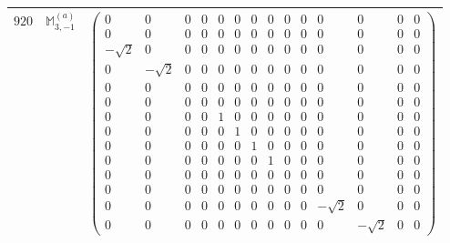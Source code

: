 \documentclass[fleqn,8pt,landscape]{jsarticle}
\begin{document}
\begin{center}
\begin{longtable}{ccc}
$ 920 $ & $ \mathbb{M}_{3,-1}^{(a)} $ & $ \begin{pmatrix} 0 & 0 & 0 & 0 & 0 & 0 & 0 & 0 & 0 & 0 & 0 & 0 & 0 & 0 \\ 0 & 0 & 0 & 0 & 0 & 0 & 0 & 0 & 0 & 0 & 0 & 0 & 0 & 0 \\ - \sqrt{2} & 0 & 0 & 0 & 0 & 0 & 0 & 0 & 0 & 0 & 0 & 0 & 0 & 0 \\ 0 & - \sqrt{2} & 0 & 0 & 0 & 0 & 0 & 0 & 0 & 0 & 0 & 0 & 0 & 0 \\ 0 & 0 & 0 & 0 & 0 & 0 & 0 & 0 & 0 & 0 & 0 & 0 & 0 & 0 \\ 0 & 0 & 0 & 0 & 0 & 0 & 0 & 0 & 0 & 0 & 0 & 0 & 0 & 0 \\ 0 & 0 & 0 & 0 & 1 & 0 & 0 & 0 & 0 & 0 & 0 & 0 & 0 & 0 \\ 0 & 0 & 0 & 0 & 0 & 1 & 0 & 0 & 0 & 0 & 0 & 0 & 0 & 0 \\ 0 & 0 & 0 & 0 & 0 & 0 & 1 & 0 & 0 & 0 & 0 & 0 & 0 & 0 \\ 0 & 0 & 0 & 0 & 0 & 0 & 0 & 1 & 0 & 0 & 0 & 0 & 0 & 0 \\ 0 & 0 & 0 & 0 & 0 & 0 & 0 & 0 & 0 & 0 & 0 & 0 & 0 & 0 \\ 0 & 0 & 0 & 0 & 0 & 0 & 0 & 0 & 0 & 0 & 0 & 0 & 0 & 0 \\ 0 & 0 & 0 & 0 & 0 & 0 & 0 & 0 & 0 & 0 & - \sqrt{2} & 0 & 0 & 0 \\ 0 & 0 & 0 & 0 & 0 & 0 & 0 & 0 & 0 & 0 & 0 & - \sqrt{2} & 0 & 0 \end{pmatrix} $ \\ \hline

\end{longtable}
\end{center}
\end{document}
